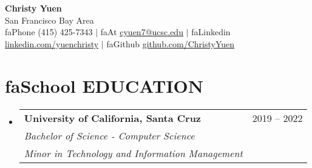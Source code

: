 \documentclass[a4paper,11pt]{article}
\makeatletter
\newcommand{\seticon}[1]{\textcolor{Cerulean}{\csname #1\endcsname}}
\newcommand{\resumeSubheading}[4]{
  \vspace{-2pt}\item
    \begin{tabular*}{0.97\textwidth}[t]{l@{\extracolsep{\fill}}r}
      \textbf{#1} & #2 \\
      \textit{\small#3} & \textnormal{\small #4} \\
    \end{tabular*}\vspace{-8pt}
}
\newcommand{\resumeSub}[6]{ %
  \vspace{-2pt}\item
    \begin{tabular*}{0.97\textwidth}[t]{l@{\extracolsep{\fill}}r}
      \textbf{#1} & #2 \\
      \textit{\small#3} & \textnormal{\small #4} \\
      \textit{\small#5} & \textnormal{\small #6} \\
    \end{tabular*} \vspace{-8pt}
}
\newcommand{\resumeSubHeadingListStart}{\begin{itemize}[leftmargin=0.15in, label={}]}
\newcommand{\resumeSubHeadingListEnd}{\end{itemize}}
\makeatother
\begin{document}
\iffalse
\begin{wrapfigure}{R}{0.15\textwidth}
\vspace{-25pt}
\texttt{[image: dp\_cropped]}
\end{wrapfigure}
\fi

\begin{center}
    \textbf{\Huge Christy Yuen} \\
    \normalfont San Francisco Bay Area \vspace{1pt} \\
    \small \seticon{faPhone} (415) 425-7343 $|$ 
    \seticon{faAt} \href{mailto:x@x.com}{\ul{cyuen7@ucsc.edu}} $|$ 
    \seticon{faLinkedin} 
    		\href{https://www.linkedin.com/in/yuenchristy/}{\ul{linkedin.com/yuenchristy}} $|$ 
    \seticon{faGithub} 
    		\href{https://github.com/ChristyYuen}{\ul{github.com/ChristyYuen}}
\end{center}
\vspace{-12pt} %
\section{\seticon{faSchool} \textbf{EDUCATION}}
  \resumeSubHeadingListStart
    \resumeSub
      {University of California, Santa Cruz}{2019 -- 2022}
      {Bachelor of Science - Computer Science}{}
      {Minor in Technology and Information Management}{}   
  \resumeSubHeadingListEnd
\end{document}

